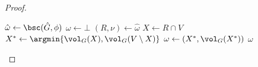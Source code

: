 \begin{proof}
\begin{algorithm}[h]
	\caption{\textsc{SelfLoopBalSparseCut}: reduction to self-loop free BSCA}
	\label{alg:selfloop}
	\begin{algorithmic}[1]
		\State $\hat{\omega} \gets \bsc(\hat{G},\phi)$ 
		\If{$\hat{\omega} = \bot$}
			\State $\omega \gets \bot$
		\Else
		\State $(R,\nu) \gets \hat{\omega}$
		\State $X \gets R \cap V$
		\State $X^* \gets \argmin\{\vol_G(X),\vol_G(V \setminus X)\}$
		\State $\omega \gets (X^*, \vol_G(X^*))$
		\EndIf
		\State \Return $\omega$
		\EndProcedure
	\end{algorithmic}
\end{algorithm}


\end{proof}
